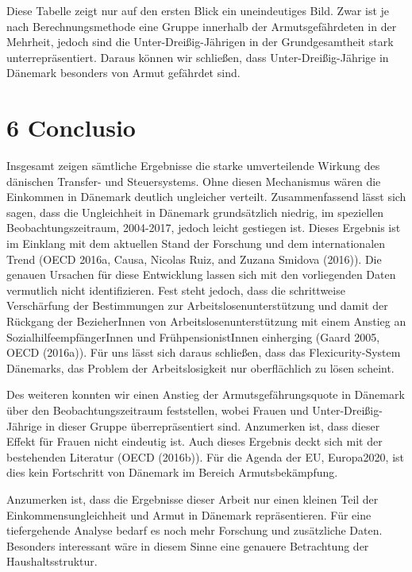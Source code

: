 \documentclass[12pt,]{article}
\begin{document}
Diese Tabelle zeigt nur auf den ersten Blick ein uneindeutiges Bild.
Zwar ist je nach Berechnungsmethode eine Gruppe innerhalb der
Armutsgefährdeten in der Mehrheit, jedoch sind die
Unter-Dreißig-Jährigen in der Grundgesamtheit stark unterrepräsentiert.
Daraus können wir schließen, dass Unter-Dreißig-Jährige in Dänemark
besonders von Armut gefährdet sind.

\section{6 Conclusio}\label{conclusio}

Insgesamt zeigen sämtliche Ergebnisse die starke umverteilende Wirkung
des dänischen Transfer- und Steuersystems. Ohne diesen Mechanismus wären
die Einkommen in Dänemark deutlich ungleicher verteilt. Zusammenfassend
lässt sich sagen, dass die Ungleichheit in Dänemark grundsätzlich
niedrig, im speziellen Beobachtungszeitraum, 2004-2017, jedoch leicht
gestiegen ist. Dieses Ergebnis ist im Einklang mit dem aktuellen Stand
der Forschung und dem internationalen Trend (OECD 2016a, Causa, Nicolas
Ruiz, and Zuzana Smidova (2016)). Die genauen Ursachen für diese
Entwicklung lassen sich mit den vorliegenden Daten vermutlich nicht
identifizieren. Fest steht jedoch, dass die schrittweise Verschärfung
der Bestimmungen zur Arbeitslosenunterstützung und damit der Rückgang
der BezieherInnen von Arbeitslosenunterstützung mit einem Anstieg an
SozialhilfeempfängerInnen und FrühpensionistInnen einherging (Gaard
2005, OECD (2016a)). Für uns lässt sich daraus schließen, dass das
Flexicurity-System Dänemarks, das Problem der Arbeitslosigkeit nur
oberflächlich zu lösen scheint.

Des weiteren konnten wir einen Anstieg der Armutsgefährungsquote in
Dänemark über den Beobachtungszeitraum feststellen, wobei Frauen und
Unter-Dreißig-Jährige in dieser Gruppe überrepräsentiert sind.
Anzumerken ist, dass dieser Effekt für Frauen nicht eindeutig ist. Auch
dieses Ergebnis deckt sich mit der bestehenden Literatur (OECD (2016b)).
Für die Agenda der EU, Europa2020, ist dies kein Fortschritt von
Dänemark im Bereich Armutsbekämpfung.

Anzumerken ist, dass die Ergebnisse dieser Arbeit nur einen kleinen Teil
der Einkommensungleichheit und Armut in Dänemark repräsentieren. Für
eine tiefergehende Analyse bedarf es noch mehr Forschung und zusätzliche
Daten. Besonders interessant wäre in diesem Sinne eine genauere
Betrachtung der Haushaltsstruktur.

\newpage
\end{document}
